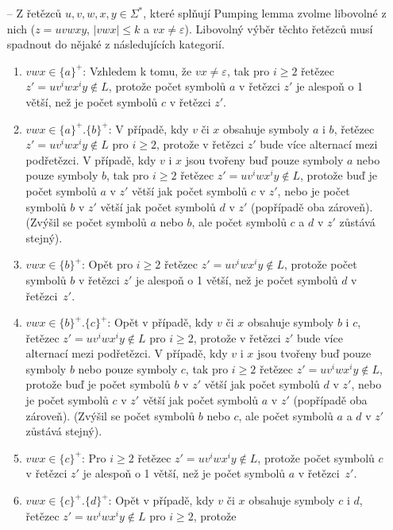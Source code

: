 \documentclass[a4paper,12pt]{article}
\begin{document}
\begin{enumerate}[label=\textbf{\arabic*}.]
\begin{itemize}
   \item[--] Z řetězců $u, v, w, x, y \in\Sigma^*$, které splňují Pumping lemma zvolme libovolné z nich 
   ($z = uvwxy$, $|vwx| \leq k$ a $vx\neq\varepsilon$). Libovolný výběr těchto řetězců musí spadnout do nějaké z následujících kategorií.
   \begin{enumerate}
    \item $vwx \in \{a\}^+$: Vzhledem k tomu, že $vx\neq\varepsilon$, tak pro $i \geq 2$  řetězec 
      $z' = uv^iwx^iy \notin L$, protože počet symbolů $a$ v řetězci $z'$ je alespoň o 1 větší, než je počet symbolů $c$ v řetězci $z'$.
    \item $vwx \in \{a\}^+.\{b\}^+$: V případě, kdy $v$ či $x$ obsahuje symboly $a$ i $b$, řetězec $z' = uv^iwx^iy \notin L$ pro $i\geq 2$, protože 
      v řetězci $z'$ bude více alternací mezi podřetězci. V případě, kdy $v$ i $x$ jsou tvořeny buď pouze symboly $a$ nebo pouze symboly $b$, tak 
      pro $i \geq 2$ řetězec $z' = uv^iwx^iy \notin L$, protože buď je počet symbolů $a$ v $z'$ větší jak počet symbolů $c$ v $z'$, nebo je počet 
      symbolů $b$ v $z'$ větší jak počet symbolů $d$ v $z'$ (popřípadě oba zároveň). 
      (Zvýšil se počet symbolů $a$ nebo $b$, ale počet symbolů $c$ a $d$ v $z'$ zůstává stejný).
    \item $vwx \in \{b\}^+$: Opět pro $i \geq 2$ řetězec 
      $z' = uv^iwx^iy \notin L$, protože počet symbolů $b$ v řetězci $z'$ je alespoň o 1 větší, než je počet symbolů $d$ v řetězci~$z'$.
    \item $vwx \in \{b\}^+.\{c\}^+$: Opět v případě, kdy $v$ či $x$ obsahuje symboly $b$ i $c$, řetězec $z' = uv^iwx^iy \notin L$ pro $i\geq 2$, protože 
      v řetězci $z'$ bude více alternací mezi podřetězci. V případě, kdy $v$ i $x$ jsou tvořeny buď pouze symboly $b$ nebo pouze symboly $c$, tak 
      pro $i \geq 2$ řetězec $z' = uv^iwx^iy \notin L$, protože buď je počet symbolů $b$ v $z'$ větší jak počet symbolů $d$ v $z'$, nebo je počet 
      symbolů $c$ v $z'$ větší jak počet symbolů $a$ v $z'$ (popřípadě oba zároveň). 
      (Zvýšil se počet symbolů $b$ nebo $c$, ale počet symbolů $a$ a $d$ v $z'$ zůstává stejný).
    \item $vwx \in \{c\}^+$: Pro $i \geq 2$ řetězec 
      $z' = uv^iwx^iy \notin L$, protože počet symbolů $c$ v řetězci $z'$ je alespoň o 1 větší, než je počet symbolů $a$ v řetězci~$z'$.
    \item $vwx \in \{c\}^+.\{d\}^+$: Opět v případě, kdy $v$ či $x$ obsahuje symboly $c$ i $d$, řetězec $z' = uv^iwx^iy \notin L$ pro $i\geq 2$, protože 

\end{enumerate}
\end{itemize}
\end{enumerate}
\end{document}
